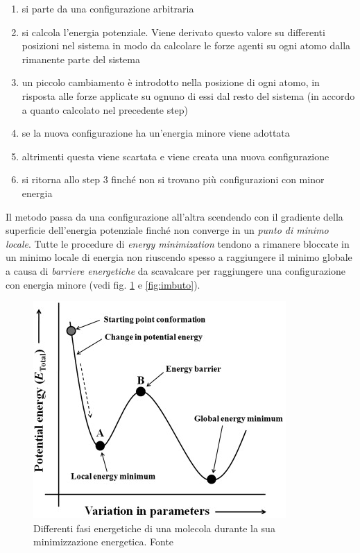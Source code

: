 {{\begin{enumerate}
	\item si parte da una configurazione arbitraria
	\item si calcola l'energia potenziale. Viene derivato questo valore su differenti posizioni nel sistema in modo da calcolare le forze agenti su ogni atomo dalla rimanente parte del sistema
	\item un piccolo cambiamento è introdotto nella posizione di ogni atomo, in risposta alle forze applicate su ognuno di essi dal resto del sistema (in accordo a quanto calcolato nel precedente step)
	\item se la nuova configurazione ha un'energia minore viene adottata
	\item altrimenti questa viene scartata e viene creata una nuova configurazione
	\item si ritorna allo step 3 finché non si trovano più configurazioni con minor energia
\end{enumerate}

Il metodo passa da una configurazione all'altra scendendo con il gradiente della superficie dell'energia potenziale finché non converge in un \textit{punto di minimo locale}. Tutte le procedure di \textit{energy minimization }tendono a rimanere bloccate in un minimo locale di energia non riuscendo spesso a raggiungere il minimo globale a causa di \textit{barriere energetiche} da scavalcare per raggiungere una configurazione con energia minore (vedi fig. \ref{fig:energy-minimization} e \ref{fig:imbuto}).

\begin{figure}[!htb]
	\centering
	\includegraphics[scale=1]{images/energy-minimzation.jpg}
	\caption{Differenti fasi energetiche di una molecola durante la sua minimizzazione energetica. Fonte\cite{ROY2015151}}
	\label{fig:energy-minimization}
\end{figure}

}}
